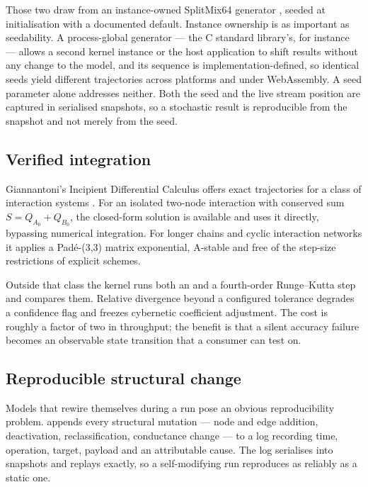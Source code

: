 \documentclass[11pt,a4paper]{article}
\begin{document}
Those two draw from an instance-owned SplitMix64 generator \citep{steele2014}, seeded at initialisation with a documented default. Instance ownership is as important as seedability. A process-global generator --- the C standard library's, for instance --- allows a second kernel instance or the host application to shift results without any change to the model, and its sequence is implementation-defined, so identical seeds yield different trajectories across platforms and under WebAssembly. A seed parameter alone addresses neither. Both the seed and the live stream position are captured in serialised snapshots, so a stochastic result is reproducible from the snapshot and not merely from the seed.

\subsection{Verified integration}

Giannantoni's Incipient Differential Calculus offers exact trajectories for a class of interaction systems \citep{giannantoni2006}. For an isolated two-node interaction with conserved sum $S = Q_{A_0} + Q_{B_0}$, the closed-form solution is available and \gssk{} uses it directly, bypassing numerical integration. For longer chains and cyclic interaction networks it applies a Padé-(3,3) matrix exponential, A-stable and free of the step-size restrictions of explicit schemes.

Outside that class the kernel runs both an \idc{} and a fourth-order Runge--Kutta step and compares them. Relative divergence beyond a configured tolerance degrades a confidence flag and freezes cybernetic coefficient adjustment. The cost is roughly a factor of two in throughput; the benefit is that a silent accuracy failure becomes an observable state transition that a consumer can test on.

\subsection{Reproducible structural change}

Models that rewire themselves during a run pose an obvious reproducibility problem. \gssk{} appends every structural mutation --- node and edge addition, deactivation, reclassification, conductance change --- to a log recording time, operation, target, payload and an attributable cause. The log serialises into snapshots and replays exactly, so a self-modifying run reproduces as reliably as a static one.
\end{document}
